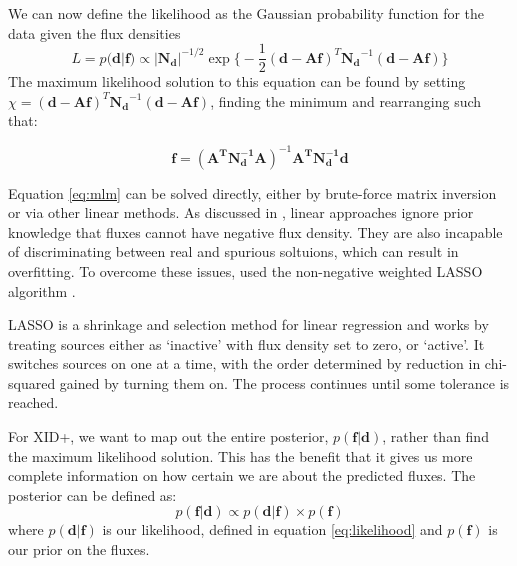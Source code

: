 \documentclass[useAMS,usenatbib]{mnras}
\begin{document}
 We can now define the likelihood as the Gaussian probability function for the data given the flux densities
\begin{equation}
L = p(\mathbf{d}|\mathbf{f}) \propto |\mathbf{N_d}|^{-1/2} \exp\big\{ -\frac{1}{2}(\mathbf{d}-\mathbf{Af})^T\mathbf{N_d}^{-1}(\mathbf{d}-\mathbf{Af})\big\}\label{eq:likelihood}
\end{equation}
The maximum likelihood solution to this equation can be found by setting $\chi = (\mathbf{d}-\mathbf{Af})^T\mathbf{N_d}^{-1}(\mathbf{d}-\mathbf{Af})$, finding the minimum and rearranging such that:

\begin{equation}
\mathbf{f}=(\mathbf{A^TN_d^{-1}A})^{-1}\mathbf{A^TN_d^{-1}d}\label{eq:mlm}
\end{equation}

Equation \ref{eq:mlm} can be solved directly, either by brute-force matrix inversion or via other linear methods. As discussed in \cite{Roseboom:2010, Roseboom:2011, Wang:2014}, linear approaches ignore prior knowledge that fluxes cannot have negative flux density.  They are also incapable of discriminating between real and spurious soltuions, which can result in overfitting. To overcome these issues, \cite{Roseboom:2011} used the non-negative weighted LASSO algorithm \citep{Tibshirani:1996, Zou:2006, terBraak:2010}.

LASSO is a shrinkage and selection method for linear regression and works by treating sources either as `inactive' with flux density set to zero, or `active'. It switches sources on one at a time, with the order determined by reduction in chi-squared gained by turning them on. The process continues until some tolerance is reached.

%

For \textsc{XID+}, we want to map out the entire posterior, $p(\mathbf{f}|\mathbf{d})$, rather than find the maximum likelihood solution. This has the benefit that it gives us more complete information on how certain we are about the predicted fluxes. The posterior can be defined as:
\begin{equation}
p(\mathbf{f}|\mathbf{d}) \propto p(\mathbf{d}|\mathbf{f}) \times p(\mathbf{f})
\end{equation}
where $p(\mathbf{d}|\mathbf{f})$ is our likelihood, defined in equation \ref{eq:likelihood} and $p(\mathbf{f})$ is our prior on the fluxes. 
\end{document}
